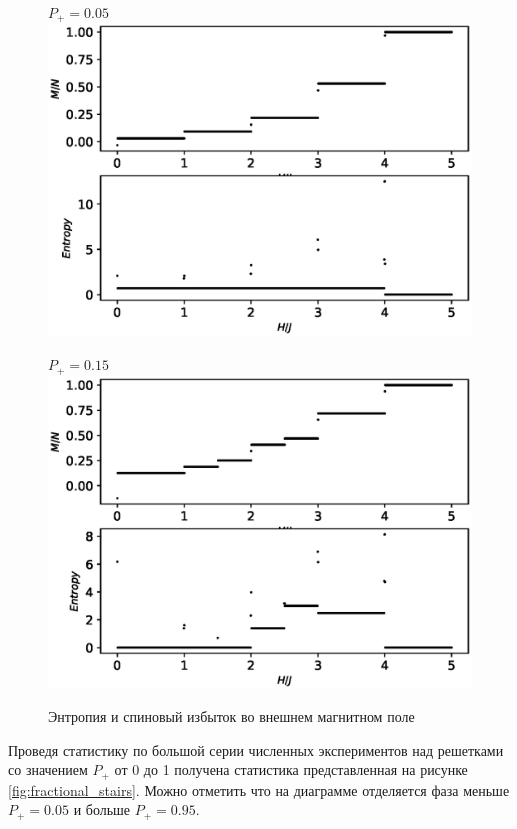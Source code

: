 \documentclass[utf8, babel, sor, jor, amsmath, amssymb, reprint]{elsarticle} %
\begin{document}
\begin{figure}[H]
	\begin{minipage}[h]{0.45\linewidth}
		\centering $P_+ = 0.05$
		\includegraphics[width=1\linewidth]{images/Entopy_and_se_P0.05.eps}
	\end{minipage}
	\hfill
	\begin{minipage}[h]{0.45\linewidth}
		\centering $P_+ = 0.15$
		\includegraphics[width=1\linewidth]{images/Entopy_and_se_P0.15.eps}
	\end{minipage}
	\caption{Энтропия и спиновый избыток во внешнем магнитном поле}
	\label{fig:entropy_sp_acros_AFM}
\end{figure}

Проведя статистику по большой серии численных экспериментов над решетками со значением $P_+$ от 0 до 1 получена статистика представленная на рисунке \ref{fig:fractional_stairs}. Можно отметить что на диаграмме отделяется фаза меньше $P_+ = 0.05$ и больше $P_+ = 0.95$.
\end{document}

